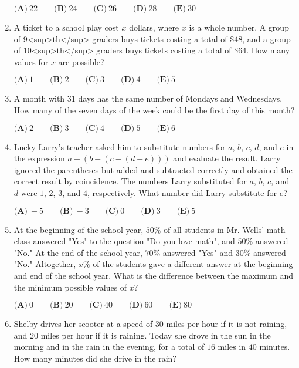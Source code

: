 \documentclass{article}
\begin{document}
\begin{enumerate}[label=\arabic*., itemsep=0.5em]
\(\textbf{(A)}\ 22 \qquad \textbf{(B)}\ 24 \qquad \textbf{(C)}\ 26 \qquad \textbf{(D)}\ 28 \qquad \textbf{(E)}\ 30\)\par \vspace{0.5em}\item A ticket to a school play cost \(x\) dollars, where \(x\) is a whole number. A group of 9<sup>th</sup> graders buys tickets costing a total of \$\(48\), and a group of 10<sup>th</sup> graders buys tickets costing a total of \$\(64\). How many values for \(x\) are possible?

\(\textbf{(A)}\ 1 \qquad \textbf{(B)}\ 2 \qquad \textbf{(C)}\ 3 \qquad \textbf{(D)}\ 4 \qquad \textbf{(E)}\ 5\)\par \vspace{0.5em}\item A month with \(31\) days has the same number of Mondays and Wednesdays. How many of the seven days of the week could be the first day of this month?

\(\textbf{(A)}\ 2 \qquad \textbf{(B)}\ 3 \qquad \textbf{(C)}\ 4 \qquad \textbf{(D)}\ 5 \qquad \textbf{(E)}\ 6\)\par \vspace{0.5em}\item Lucky Larry's teacher asked him to substitute numbers for \(a\), \(b\), \(c\), \(d\), and \(e\) in the expression \(a-(b-(c-(d+e)))\) and evaluate the result. Larry ignored the parentheses but added and subtracted correctly and obtained the correct result by coincidence. The numbers Larry substituted for \(a\), \(b\), \(c\), and \(d\) were \(1\), \(2\), \(3\), and \(4\), respectively. What number did Larry substitute for \(e\)?

\(\textbf{(A)}\ -5 \qquad \textbf{(B)}\ -3 \qquad \textbf{(C)}\ 0 \qquad \textbf{(D)}\ 3 \qquad \textbf{(E)}\ 5\)\par \vspace{0.5em}\item At the beginning of the school year, \(50\%\) of all students in Mr. Wells' math class answered "Yes" to the question "Do you love math", and \(50\%\) answered "No." At the end of the school year, \(70\%\) answered "Yes" and \(30\%\) answered "No." Altogether, \(x\%\) of the students gave a different answer at the beginning and end of the school year. What is the difference between the maximum and the minimum possible values of \(x\)?

\(\textbf{(A)}\ 0 \qquad \textbf{(B)}\ 20 \qquad \textbf{(C)}\ 40 \qquad \textbf{(D)}\ 60 \qquad \textbf{(E)}\ 80\)\par \vspace{0.5em}\item Shelby drives her scooter at a speed of \(30\) miles per hour if it is not raining, and \(20\) miles per hour if it is raining. Today she drove in the sun in the morning and in the rain in the evening, for a total of \(16\) miles in \(40\) minutes. How many minutes did she drive in the rain?


\end{enumerate}
\end{document}
